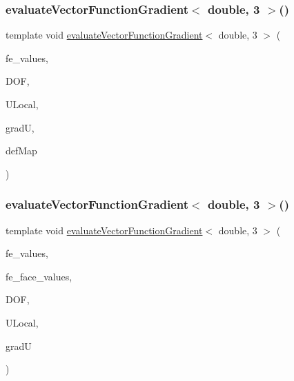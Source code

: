 \mbox{\label{function_evaluations_8cc_a05515d4765602312924bf90d040f146e}} 
\subsubsection{\texorpdfstring{evaluate\+Vector\+Function\+Gradient$<$ double, 3 $>$()}{evaluateVectorFunctionGradient< double, 3 >()}\hspace{0.1cm}{\footnotesize\ttfamily [2/4]}}
{\footnotesize\ttfamily template void \mbox{\hyperlink{group___evaluation_functions_ga9608539d601a91aff1ba01ccc720fbe0}{evaluate\+Vector\+Function\+Gradient}}$<$ double, 3 $>$ (\begin{DoxyParamCaption}\item[{const F\+E\+Values$<$ 3 $>$ \&}]{fe\+\_\+values,  }\item[{unsigned int}]{D\+OF,  }\item[{Table$<$ 1, double $>$ \&}]{U\+Local,  }\item[{Table$<$ 3, double $>$ \&}]{gradU,  }\item[{\mbox{\hyperlink{structdeformation_map}{deformation\+Map}}$<$ double, 3 $>$ \&}]{def\+Map }\end{DoxyParamCaption})}

\mbox{\label{function_evaluations_8cc_aa2d12bff0463147f781bf71f070705cc}} 
\subsubsection{\texorpdfstring{evaluate\+Vector\+Function\+Gradient$<$ double, 3 $>$()}{evaluateVectorFunctionGradient< double, 3 >()}\hspace{0.1cm}{\footnotesize\ttfamily [3/4]}}
{\footnotesize\ttfamily template void \mbox{\hyperlink{group___evaluation_functions_ga9608539d601a91aff1ba01ccc720fbe0}{evaluate\+Vector\+Function\+Gradient}}$<$ double, 3 $>$ (\begin{DoxyParamCaption}\item[{const F\+E\+Values$<$ 3 $>$ \&}]{fe\+\_\+values,  }\item[{const F\+E\+Face\+Values$<$ 3 $>$ \&}]{fe\+\_\+face\+\_\+values,  }\item[{unsigned int}]{D\+OF,  }\item[{Table$<$ 1, double $>$ \&}]{U\+Local,  }\item[{Table$<$ 3, double $>$ \&}]{gradU }\end{DoxyParamCaption})}

